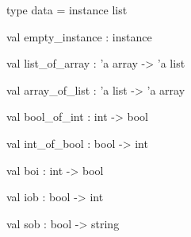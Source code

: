 \documentclass[11pt]{article}
\begin{document}
\label{type:Util.data}\begin{ocamldoccode}
type data = instance list 
\end{ocamldoccode}




\label{val:Util.empty-underscoreinstance}\begin{ocamldoccode}
val empty_instance : instance
\end{ocamldoccode}




\label{val:Util.list-underscoreof-underscorearray}\begin{ocamldoccode}
val list_of_array : 'a array -> 'a list
\end{ocamldoccode}




\label{val:Util.array-underscoreof-underscorelist}\begin{ocamldoccode}
val array_of_list : 'a list -> 'a array
\end{ocamldoccode}




\label{val:Util.bool-underscoreof-underscoreint}\begin{ocamldoccode}
val bool_of_int : int -> bool
\end{ocamldoccode}




\label{val:Util.int-underscoreof-underscorebool}\begin{ocamldoccode}
val int_of_bool : bool -> int
\end{ocamldoccode}




\label{val:Util.boi}\begin{ocamldoccode}
val boi : int -> bool
\end{ocamldoccode}




\label{val:Util.iob}\begin{ocamldoccode}
val iob : bool -> int
\end{ocamldoccode}




\label{val:Util.sob}\begin{ocamldoccode}
val sob : bool -> string
\end{ocamldoccode}
\end{document}
